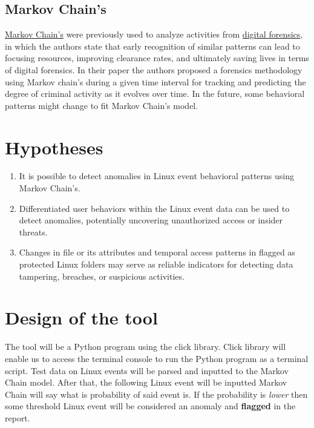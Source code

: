 \documentclass{VUMIFPSmagistrinis}
\begin{document}
    \subsection{Markov Chain's}
        \href{https://en.wikipedia.org/wiki/Markov}{Markov Chain's}
         were previously used to analyze activities from \href{https://www.researchgate.net/publication/4335500_Cyber_Criminal_Activity_Analysis_Models_using_Markov_Chain_for_Digital_Forensics}{digital forensics}, in which the authors state that early recognition of similar patterns can lead to focusing resources, improving clearance rates, and ultimately saving lives in terms of digital forensics. In their paper the authors proposed a forensics methodology using Markov chain's during a given time interval for tracking and predicting the degree of criminal activity as it evolves over time. In the future, some behavioral patterns might change to fit Markov Chain's model.

	
\section{Hypotheses}
\begin{enumerate}
    \item It is possible to detect anomalies in Linux event behavioral patterns using Markov Chain's.
    \item Differentiated user behaviors within the Linux event data can be used to detect anomalies, potentially uncovering unauthorized access or insider threats.
    \item Changes in file or its attributes and temporal access patterns in flagged as protected Linux folders may serve as reliable indicators for detecting data tampering, breaches, or suspicious activities.
\end{enumerate}
	
\section{Design of the tool}
    The tool will be a Python program using the click library. 
    Click library will enable us to access the terminal console to run the Python program as a terminal script.
    Test data on Linux events will be parsed and inputted to the Markov Chain model.
    After that, the following Linux event will be inputted Markov Chain will say what is probability of said event is.
    If the probability is \textit{lower} then some threshold Linux event will be considered an anomaly and \textbf{flagged} in the report.
    
\end{document}
